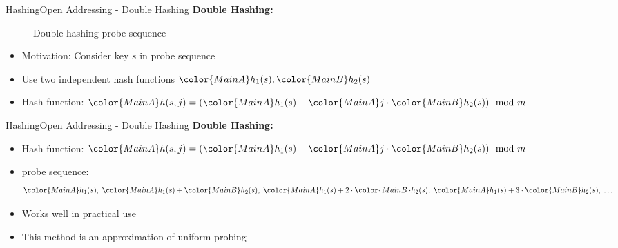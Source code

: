
\begin{frame}{Hashing}{Open Addressing - Double Hashing}
  \textbf{Double Hashing:}
  \vspace{-1.0em}
  \begin{figure}[!h]
    \begin{adjustbox}{width=0.9\linewidth}%
    \end{adjustbox}
    \caption{Double hashing probe sequence}%
    \label{fig:hashing:open_addressing:double_hashing}%
  \end{figure}
  \vspace{-1.0em}
  \begin{itemize}
    \item<2->
      Motivation: Consider key {\color{MainA}$s$} in probe sequence
    \item<3->
      Use two independent hash functions
      \begin{math}
        {\color{MainA}h_1(s)},
        {\color{MainB}h_2(s)}
      \end{math}
    \item<4->
      Hash function:
      \begin{math}
        {\color{MainA}h(s,j)
        = ({\color{MainA}h_1(s)}
        + {\color{MainA}j} \cdot {\color{MainB}h_2(s)})}
        \mod m
      \end{math}
  \end{itemize}

\end{frame}


\begin{frame}{Hashing}{Open Addressing - Double Hashing}
  \textbf{Double Hashing:}
  \begin{itemize}
    \item
      Hash function:
      \begin{math}
        {\color{MainA}h(s,j)
        = ({\color{MainA}h_1(s)}
        + {\color{MainA}j} \cdot {\color{MainB}h_2(s)})}
        \mod m
      \end{math}
    \item<2->
      probe sequence:
      \begin{displaymath}
        {\color{MainA}h_1(s)} ,\;
        {\color{MainA}h_1(s)} + {\color{MainB}h_2(s)} ,\;
        {\color{MainA}h_1(s)} + 2 \cdot {\color{MainB}h_2(s)} ,\;
        {\color{MainA}h_1(s)} + 3 \cdot {\color{MainB}h_2(s)} ,\;
        \dotsc
      \end{displaymath}
    \item<3->
      Works well in practical use
    \item<4->
      This method is an approximation of uniform probing
  \end{itemize}
\end{frame}

